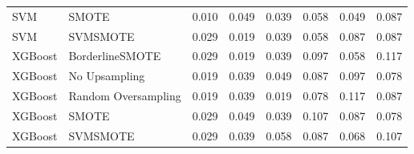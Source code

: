 \begin{tabular}{llllllll}
                            SVM &                         SMOTE & 0.010 &                     0.049 &                 0.039 &                  0.058 &                                   0.049 &    0.087 \\
                            SVM &                      SVMSMOTE & 0.029 &                     0.019 &                 0.039 &                  0.058 &                                   0.087 &    0.087 \\
                        XGBoost &               BorderlineSMOTE & 0.029 &                     0.019 &                 0.039 &                  0.097 &                                   0.058 &    0.117 \\
                        XGBoost &                 No Upsampling & 0.019 &                     0.039 &                 0.049 &                  0.087 &                                   0.097 &    0.078 \\
                        XGBoost &           Random Oversampling & 0.019 &                     0.039 &                 0.019 &                  0.078 &                                   0.117 &    0.087 \\
                        XGBoost &                         SMOTE & 0.029 &                     0.049 &                 0.039 &                  0.107 &                                   0.087 &    0.078 \\
                        XGBoost &                      SVMSMOTE & 0.029 &                     0.039 &                 0.058 &                  0.087 &                                   0.068 &    0.107 \\
\bottomrule
\end{tabular}
